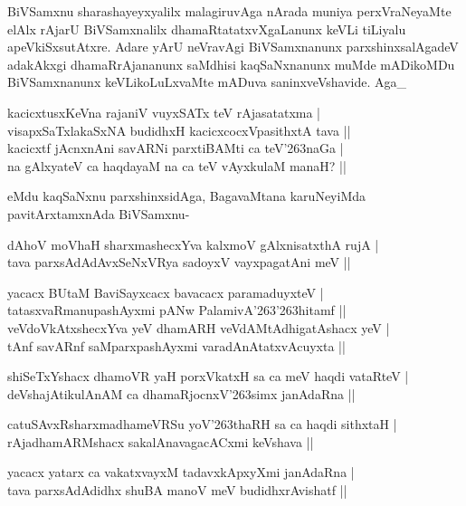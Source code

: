 \noindent
BiVSamxnu sharashayeyxyalilx malagiruvAga nArada muniya perxVraNeyaMte elAlx rAjarU BiVSamxnalilx dhamaRtatatxvXgaLanunx keVLi tiLiyalu apeVkiSxsutAtxre. Adare yArU neVravAgi BiVSamxnanunx parxshinxsalAgadeV adakAkxgi dhamaRrAjananunx saMdhisi kaqSaNxnanunx muMde mADikoMDu BiVSamxnanunx keVLikoLuLxvaMte mADuva saninxveVshavide. Aga\_

\begin{shloka}
kacicxtusxKeVna rajaniV vuyxSATx teV rAjasatatxma |\\\label{162}
visapxSaTxlakaSxNA budidhxH kacicxcocxVpasithxtA tava ||\\
kacicxtf jAcnxnAni savARNi parxtiBAMti ca teV\char'263naGa |\\
na gAlxyateV ca haqdayaM na ca teV vAyxkulaM manaH? ||
\end{shloka} 

\noindent
eMdu kaqSaNxnu parxshinxsidAga, BagavaMtana karuNeyiMda pavitArxtamxnAda BiVSamxnu-

\begin{shloka}
dAhoV moVhaH sharxmashecxYva kalxmoV gAlxnisatxthA rujA |\\
tava parxsAdAdAvxSeNxVRya sadoyxV vayxpagatAni meV ||
\end{shloka}

\begin{shloka}
yacacx BUtaM BaviSayxcacx bavacacx paramaduyxteV |\\
tatasxvaRmanupashAyxmi pANw PalamivA\char'263\char'263hitamf ||\\
veVdoVkAtxshecxYva yeV dhamARH veVdAMtAdhigatAshacx yeV |\\
tAnf savARnf saMparxpashAyxmi varadAnAtatxvAcuyxta ||
\end{shloka}

\begin{shloka}
shiSeTxYshacx dhamoVR yaH porxVkatxH sa ca meV haqdi vataRteV |\\
deVshajAtikulAnAM ca dhamaRjocnxV\char'263simx janAdaRna ||
\end{shloka}

\begin{shloka}
catuSAvxRsharxmadhameVRSu yoV\char'263thaRH sa ca haqdi sithxtaH |\\
rAjadhamARMshacx sakalAnavagacACxmi keVshava ||
\end{shloka}

\begin{shloka}
yacacx yatarx ca vakatxvayxM tadavxkApxyXmi janAdaRna |\\
tava parxsAdAdidhx shuBA manoV meV budidhxrAvishatf ||
\end{shloka}

